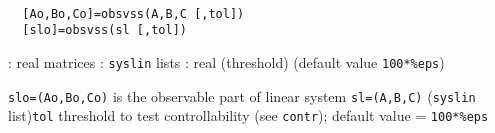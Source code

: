 \begin{mandesc}
   \\ %
\end{mandesc}
\begin{calling_sequence}
\begin{verbatim}
  [Ao,Bo,Co]=obsvss(A,B,C [,tol])  
  [slo]=obsvss(sl [,tol])  
\end{verbatim}
\end{calling_sequence}
\begin{parameters}
  \begin{varlist}
    : real matrices
    : \verb!syslin! lists
    : real (threshold) (default value \verb!100*%eps!)
  \end{varlist}
\end{parameters}
\begin{mandescription}
  \verb!slo=(Ao,Bo,Co)! is the observable part of linear system
  \verb!sl=(A,B,C)! (\verb!syslin! list)\verb!tol!  threshold to test
  controllability (see \verb!contr!); default value = \verb!100*%eps!
\end{mandescription}
\begin{manseealso}
    
     
\end{manseealso}
